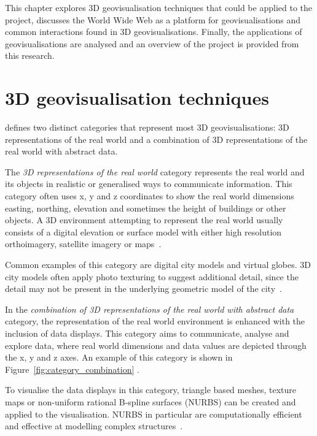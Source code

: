 
This chapter explores 3D geovisualisation techniques that could be applied to the project, discusses the World Wide Web as a platform for geovisualisations and common interactions found in 3D geovisualisations. Finally, the applications of geovisualisations are analysed and an overview of the project is provided from this research.

\section{3D geovisualisation techniques} {

	\textcite{bleisch2012geovisualization} defines two distinct categories that represent most 3D geovisualisations: 3D representations of the real world and a combination of 3D representations of the real world with abstract data.

	The \emph{3D representations of the real world} category represents the real world and its objects in realistic or generalised ways to communicate information. This category often uses x, y and z coordinates to show the real world dimensions \textendash\, easting, northing, elevation and sometimes the height of buildings or other objects. A 3D environment attempting to represent the real world usually consists of a digital elevation or surface model with either high resolution orthoimagery, satellite imagery or maps~\parencite{bleisch2012geovisualization}.

	

	Common examples of this category are digital city models and virtual globes. 3D city models often apply photo texturing to suggest additional detail, since the detail may not be present in the underlying geometric model of the city~\parencite{bleisch2012geovisualization}.

	In the \emph{combination of 3D representations of the real world with abstract data} category, the representation of the real world environment is enhanced with the inclusion of data displays. This category aims to communicate, analyse and explore data, where real world dimensions and data values are depicted through the x, y and z axes. An example of this category is shown in Figure~\ref{fig:category_combination} \parencite{bleisch2012geovisualization}.

	To visualise the data displays in this category, triangle based meshes, texture maps or non-uniform rational B-spline surfaces (NURBS) can be created and applied to the visualisation. NURBS in particular are computationally efficient and effective at modelling complex structures~\parencite{hildebrandt2011image, zhong2006enhanced}.

}


